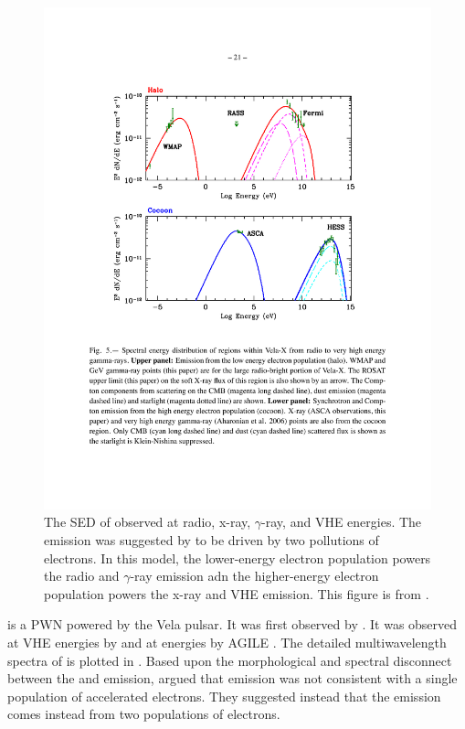 \subsubsection{\velax}

\begin{figure}[htbp]
  \centering
    \includegraphics{chapters/introduction/figures/vela_x_sed_two_populations.pdf}
    \caption{The \ac{SED} of \velax observed at radio, x-ray,
      $\gamma$-ray, and \ac{VHE} energies. The emission was suggested
      by \citep{abdo_2010c_fermi-large} to be driven by two pollutions
      of electrons.  In this model, the lower-energy electron population
      powers the radio and $\gamma$-ray emission adn the higher-energy
      electron population powers the x-ray and \ac{VHE} emission.
      This figure is from \cite{abdo_2010c_fermi-large}.}
\end{figure}

\velax is a \ac{PWN} powered by the Vela pulsar.  It was first observed
by \cite{rishbeth_1958a_radio-emission}.  It was observed at \ac{VHE}
energies by \cite{aharonian_2006a_first-detection} and at \gev
energies by \ac{AGILE} \citep{pellizzoni_2010a_detection-gamma-ray}.
The detailed multiwavelength spectra of \velax is plotted in
.  Based upon the morphological
and spectral disconnect between the \gev and \tev emission,
\citep{abdo_2010c_fermi-large} argued that emission was not consistent
with a single population of accelerated electrons.  They suggested
instead that the emission comes instead from two populations of electrons.

